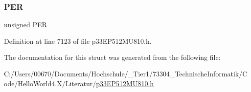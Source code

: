 \subsubsection{\texorpdfstring{P\+ER}{PER}}
{\footnotesize\ttfamily unsigned P\+ER}



Definition at line 7123 of file p33\+E\+P512\+M\+U810.\+h.



The documentation for this struct was generated from the following file\+:\begin{DoxyCompactItemize}
\item 
C\+:/\+Users/00670/\+Documents/\+Hochschule/\+\_\+\+Tier1/73304\+\_\+\+Technische\+Informatik/\+Code/\+Hello\+World4.\+X/\+Literatur/\hyperlink{p33_e_p512_m_u810_8h}{p33\+E\+P512\+M\+U810.\+h}\end{DoxyCompactItemize}
